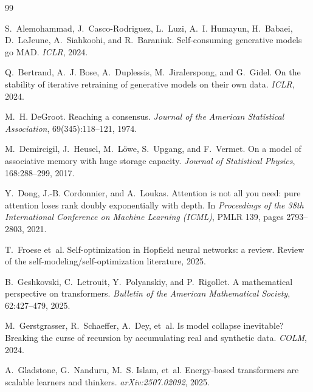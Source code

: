 \documentclass[preprint,12pt,authoryear]{elsarticle}
\begin{document}
\begin{thebibliography}{99}

S.~Alemohammad, J.~Casco-Rodriguez, L.~Luzi, A.~I. Humayun, H.~Babaei,
D.~LeJeune, A.~Siahkoohi, and R.~Baraniuk.
\newblock Self-consuming generative models go {MAD}.
\newblock \emph{ICLR}, 2024.

Q.~Bertrand, A.~J. Bose, A.~Duplessis, M.~Jiralerspong, and G.~Gidel.
\newblock On the stability of iterative retraining of generative models on
their own data.
\newblock \emph{ICLR}, 2024.

M.~H. DeGroot.
\newblock Reaching a consensus.
\newblock \emph{Journal of the American Statistical Association},
69(345):118--121, 1974.

M.~Demircigil, J.~Heusel, M.~L{\"o}we, S.~Upgang, and F.~Vermet.
\newblock On a model of associative memory with huge storage capacity.
\newblock \emph{Journal of Statistical Physics}, 168:288--299, 2017.

Y.~Dong, J.-B. Cordonnier, and A.~Loukas.
\newblock Attention is not all you need: pure attention loses rank doubly
exponentially with depth.
\newblock In \emph{Proceedings of the 38th International Conference on
Machine Learning (ICML)}, PMLR 139, pages 2793--2803, 2021.

T.~Froese et~al.
\newblock Self-optimization in {Hopfield} neural networks: a review.
\newblock Review of the self-modeling/self-optimization literature, 2025.

B.~Geshkovski, C.~Letrouit, Y.~Polyanskiy, and P.~Rigollet.
\newblock A mathematical perspective on transformers.
\newblock \emph{Bulletin of the American Mathematical Society},
62:427--479, 2025.

M.~Gerstgrasser, R.~Schaeffer, A.~Dey, et~al.
\newblock Is model collapse inevitable? {Breaking} the curse of recursion by
accumulating real and synthetic data.
\newblock \emph{COLM}, 2024.

A.~Gladstone, G.~Nanduru, M.~S. Islam, et~al.
\newblock Energy-based transformers are scalable learners and thinkers.
\newblock \emph{arXiv:2507.02092}, 2025.


\end{thebibliography}
\end{document}
